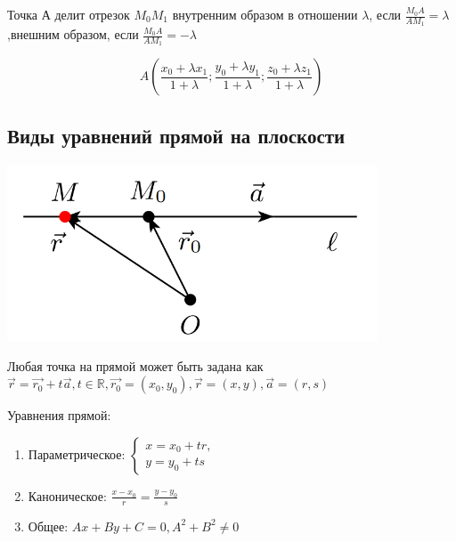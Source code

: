 \documentclass[a4paper]{article}
\begin{document}
    Точка А делит отрезок $M_0 M_1$ внутренним образом в отношении $\lambda$, если $\displaystyle \frac{M_0 A}{A M_1} = \lambda$,\newline внешним образом, если $\displaystyle \frac{M_0 A}{A M_1} = -\lambda$

    \begin{equation}
        \displaystyle A \left( \frac{x_0 + \lambda x_1}{1 + \lambda}; \frac{y_0 + \lambda y_1}{1 + \lambda}; \frac{z_0 + \lambda z_1}{1+\lambda}\right)
    \end{equation}

    \newpage \begin{center}
                 \begin{Large}
                 \end{Large}
    \end{center}

    \subsection*{Виды уравнений прямой на плоскости}

    \includegraphics[width=11cm]{t6}

    Любая точка на прямой может быть задана как $\vec{r} = \vec{r_0} + t\vec{a}, t \in \mathbb{R}, \vec{r_0} = (x_0, y_0), \vec{r} = (x,y), \vec{a} = (r, s)$

    Уравнения прямой:
    \begin{enumerate}


        \item Параметрическое: $
        \begin{cases}
            x = x_0 + tr,
            \\
            y = y_0 + ts
        \end{cases}$

        \item Каноническое: $\displaystyle \frac{x-x_0}{r} = \frac{y-y_0}{s}$
        \item Общее: $Ax + By + C = 0, A^2 + B^2 \neq 0$
    \end{enumerate}
\end{document}
